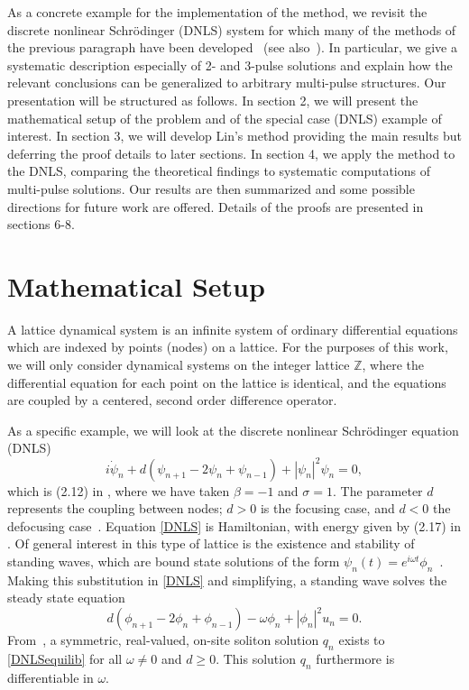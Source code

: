 \documentclass[12pt]{elsarticle}
\def\Z{{\mathbb Z}}
\begin{document}
As a concrete example for the implementation of the method, we revisit the
discrete nonlinear Schr{\"o}dinger (DNLS) system for which many of the methods of the previous paragraph have been developed~\cite{Kevrekidis2009} (see also~\cite{pelinovsky_2011}). In particular, we give a 
systematic description especially of 2- and 3-pulse solutions and explain how the relevant conclusions can be generalized
to arbitrary multi-pulse structures. 
Our presentation will be structured as follows.
In section 2, we will present the mathematical
setup of the problem and of the special case (DNLS)
example of interest. In section 3, we will develop
Lin's method providing the main results but deferring
the proof details to later sections. In section 4,
we apply the method to the DNLS, comparing the theoretical findings to systematic computations of multi-pulse solutions. Our results are then summarized and some possible directions for future work are offered. Details of the proofs are presented in sections 6-8.

\section{Mathematical Setup}

A lattice dynamical system is an infinite system of ordinary differential equations which are indexed by points (nodes)
on a lattice. For the purposes of this work, we will only consider dynamical systems on the integer lattice $\Z$, where the differential equation for each point on the lattice is identical, and the equations are coupled by a centered, second order difference operator.

As a specific example, we will look at the discrete nonlinear Schr{\"o}dinger equation (DNLS)
\begin{equation}\label{DNLS}
i\dot{\psi}_n + d(\psi_{n+1} - 2 \psi_n + \psi_{n-1}) + |\psi_n|^2 \psi_n = 0,
\end{equation}
which is (2.12) in \cite{Kevrekidis2009}, where we have taken $\beta = -1$ and $\sigma = 1$. The parameter $d$ represents the coupling between nodes; $d > 0$ is the focusing case, and $d < 0$ the defocusing case~\cite{Kevrekidis2009}. Equation \eqref{DNLS} is Hamiltonian, with energy given by (2.17) in \cite{Kevrekidis2009,pelinovsky_2011}. Of general interest in this type of lattice is the existence and stability of standing waves, which are bound state solutions of the form $\psi_n(t) = e^{i \omega t}\phi_n$~\cite{alfimov}. Making this substitution in \eqref{DNLS} and simplifying, a standing wave solves the steady state equation
\begin{equation}\label{DNLSequilib}
d(\phi_{n+1} - 2 \phi_n + \phi_{n-1}) - \omega \phi_n + |\phi_n|^2 u_n = 0.
\end{equation}
From~\cite{herrmann_2011}, a symmetric, real-valued, on-site soliton solution $q_n$ exists to \eqref{DNLSequilib} for all $\omega \neq 0$ and $d \geq 0$. This solution $q_n$ furthermore is differentiable in $\omega$. 
\end{document}
